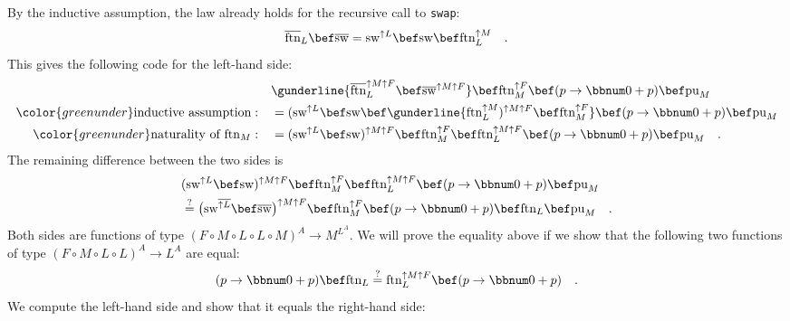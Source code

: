 By the inductive assumption, the law already holds for the recursive
call to \lstinline!swap!:
\[
\overline{\text{ftn}}_{L}\bef\overline{\text{sw}}=\text{sw}^{\uparrow L}\bef\text{sw}\bef\text{ftn}_{L}^{\uparrow M}\quad.
\]
This gives the following code for the left-hand side:
\begin{align*}
 & \gunderline{\overline{\text{ftn}}_{L}^{\uparrow M\uparrow F}\bef\overline{\text{sw}}^{\uparrow M\uparrow F}}\bef\text{ftn}_{M}^{\uparrow F}\bef(p\rightarrow\bbnum 0+p)\bef\text{pu}_{M}\\
{\color{greenunder}\text{inductive assumption}:}\quad & =(\text{sw}^{\uparrow L}\bef\text{sw}\bef\gunderline{\text{ftn}_{L}^{\uparrow M})^{\uparrow M\uparrow F}\bef\text{ftn}_{M}^{\uparrow F}}\bef(p\rightarrow\bbnum 0+p)\bef\text{pu}_{M}\\
{\color{greenunder}\text{naturality of }\text{ftn}_{M}:}\quad & =(\text{sw}^{\uparrow L}\bef\text{sw})^{\uparrow M\uparrow F}\bef\text{ftn}_{M}^{\uparrow F}\bef\text{ftn}_{L}^{\uparrow M\uparrow F}\bef(p\rightarrow\bbnum 0+p)\bef\text{pu}_{M}\quad.
\end{align*}
The remaining difference between the two sides is
\begin{align*}
 & (\text{sw}^{\uparrow L}\bef\text{sw})^{\uparrow M\uparrow F}\bef\text{ftn}_{M}^{\uparrow F}\bef\text{ftn}_{L}^{\uparrow M\uparrow F}\bef(p\rightarrow\bbnum 0+p)\bef\text{pu}_{M}\\
 & \overset{?}{=}\big(\text{sw}^{\overline{\uparrow L}}\bef\overline{\text{sw}}\big)^{\uparrow M\uparrow F}\bef\text{ftn}_{M}^{\uparrow F}\bef(p\rightarrow\bbnum 0+p)\bef\text{ftn}_{L}\bef\text{pu}_{M}\quad.
\end{align*}
Both sides are functions of type $(F\circ M\circ L\circ L\circ M)^{A}\rightarrow M^{L^{A}}$.
We will prove the equality above if we show that the following two
functions of type $(F\circ M\circ L\circ L)^{A}\rightarrow L^{A}$
are equal:
\[
(p\rightarrow\bbnum 0+p)\bef\text{ftn}_{L}\overset{?}{=}\text{ftn}_{L}^{\uparrow M\uparrow F}\bef(p\rightarrow\bbnum 0+p)\quad.
\]
We compute the left-hand side and show that it equals the right-hand
side:

